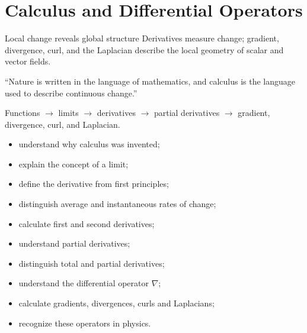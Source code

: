 \chapter{Calculus and Differential Operators}
\chapteropeningart
{Local change reveals global structure}
{Derivatives measure change; gradient, divergence, curl, and the Laplacian
describe the local geometry of scalar and vector fields.}

\chapterquote
{``Nature is written in the language of mathematics, and calculus is the language
used to describe continuous change.''}
{}

\begin{roadmapbox}
Functions $\longrightarrow$ limits $\longrightarrow$ derivatives
$\longrightarrow$ partial derivatives $\longrightarrow$
gradient, divergence, curl, and Laplacian.
\end{roadmapbox}


\learningobjectives

\begin{itemize}
	\item understand why calculus was invented;
	\item explain the concept of a limit;
	\item define the derivative from first principles;
	\item distinguish average and instantaneous rates of change;
	\item calculate first and second derivatives;
	\item understand partial derivatives;
	\item distinguish total and partial derivatives;
	\item understand the differential operator $\nabla$;
	\item calculate gradients, divergences, curls and Laplacians;
	\item recognize these operators in physics.
\end{itemize}

\newpage


